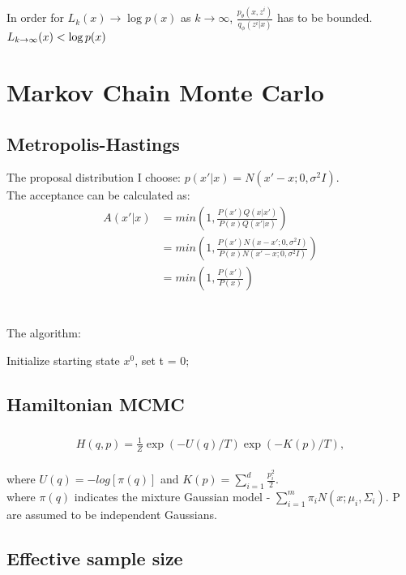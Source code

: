 \documentclass{article}
\begin{document}
\subsubsection{}
In order for $L_k(x) \rightarrow \log p(x)$ as $k \rightarrow \infty$, $\frac{p_{\theta}(x, z^i)}{q_{\phi}(z^i|x)}$ has to be bounded. \\
$
L_{k\rightarrow \infty}(x) < \log p(x) \\
$

\newpage
\section{Markov Chain Monte Carlo}
\subsection{Metropolis-Hastings}
The proposal distribution I choose: $p(x' | x) = N(x'-x; 0, \sigma^2I)$.\\
The acceptance can be calculated as: \\
\begin{align*}
	A(x'|x) &= min(1, \frac{P(x')Q(x|x')}{P(x)Q(x'|x)}) \\
	&= min(1, \frac{P(x')N(x-x'; 0, \sigma^2I)}{P(x)N(x'-x; 0, \sigma^2I)}) \\
	&= min(1, \frac{P(x')}{P(x)})
\end{align*}
\\
\\
The algorithm: \\
\begin{algorithm}[H]
Initialize starting state $x^0$, set t = 0;\\
\end{algorithm}


\subsection{Hamiltonian MCMC}
\subsubsection{}
\begin{align*}
H(q, p) = \frac{1}{Z}\exp(-U(q)/T)\exp(-K(p)/T),
\end{align*} \\
where $U(q) = -log[\pi(q)]$ and $K(p) = \sum_{i=1}^d \frac{p_i^2}{2}$. \\
where $\pi(q)$ indicates the mixture Gaussian model - $\sum_{i=1}^m \pi_i N(x; \mu_i, \Sigma_i)$. P are assumed to be independent Gaussians.

\subsubsection{}



\subsection{Effective sample size}
\end{document}
